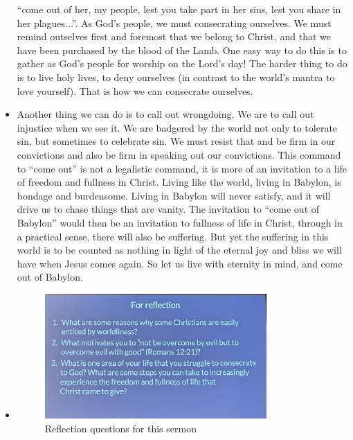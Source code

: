 \begin{itemize}
{  ``come out of her, my people, lest you take part in her sins, lest you
  share in her plagues...''.  As God's people, we must consecrating
  ourselves.  We must remind outselves first and foremost that we belong to
  Christ, and that we have been purchased by the blood of the Lamb.  One easy
  way to do this is to gather as God's people for worship on the Lord's day!
  The harder thing to do is to live holy lives, to deny ourselves (in
  contrast to the world's mantra to love yourself).  That is how we can
  consecrate ourselves.}
  \item{Another thing we can do is to call out wrongdoing.  We are to call
  out injustice when we see it.  We are badgered by the world not only to
  tolerate sin, but sometimes to celebrate sin.  We must resist that and be
  firm in our convictions and also be firm in speaking out our convictions.
  This command to ``come out'' is not a legalistic command, it is more of an
  invitation to a life of freedom and fullness in Christ.  Living like the
  world, living in Babylon, is bondage and burdensome.  Living in Babylon
  will never satisfy, and it will drive us to chase things that are vanity.
  The invitation to ``come out of Babylon'' would then be an invitation to
  fullness of life in Christ, through in a practical sense, there will also
  be suffering.  But yet the suffering in this world is to be counted as
  nothing in light of the eternal joy and bliss we will have when Jesus comes
  again.  So let us live with eternity in mind, and come out of Babylon.  }
  \item{\begin{figure}[H]
    \centering
    \includegraphics[width=0.8\textwidth, trim={0cm 0cm 0cm 0cm},clip]{Figures/aprilSermon1Reflections.jpg}
    \caption[]{Reflection questions for this sermon}
    \label{}
  \end{figure}}
\end{itemize}